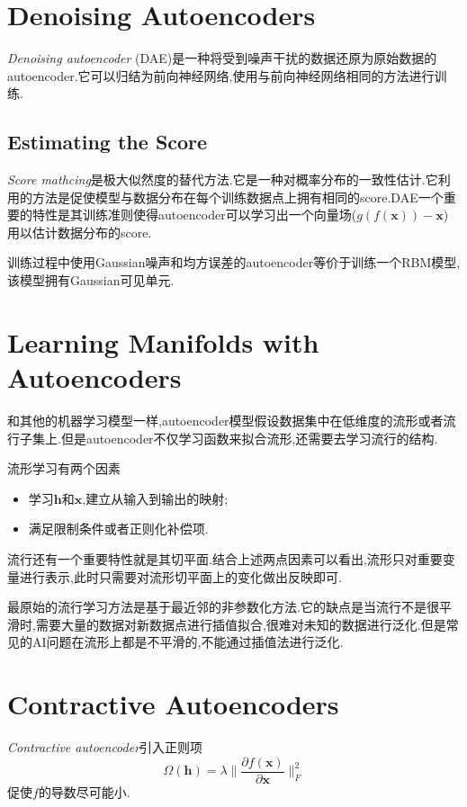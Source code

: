 \section{Denoising Autoencoders}

\textit{Denoising autoencoder} (DAE)是一种将受到噪声干扰的数据还原为原始数据的autoencoder.它可以归结为前向神经网络,使用与前向神经网络相同的方法进行训练.

\subsection{Estimating the Score}

\textit{Score mathcing}是极大似然度的替代方法.它是一种对概率分布的一致性估计.它利用的方法是促使模型与数据分布在每个训练数据点上拥有相同的score.DAE一个重要的特性是其训练准则使得autoencoder可以学习出一个向量场($g(f(\mathbf x))-\mathbf x$)用以估计数据分布的score.

训练过程中使用Gaussian噪声和均方误差的autoencoder等价于训练一个RBM模型,该模型拥有Gaussian可见单元.

\section{Learning Manifolds with Autoencoders}

和其他的机器学习模型一样,autoencoder模型假设数据集中在低维度的流形或者流行子集上.但是autoencoder不仅学习函数来拟合流形,还需要去学习流行的结构.

流形学习有两个因素
\begin{itemize}
    \item 学习$\mathbf h$和$\mathbf x$,建立从输入到输出的映射;
    \item 满足限制条件或者正则化补偿项.
\end{itemize}

流行还有一个重要特性就是其切平面.结合上述两点因素可以看出,流形只对重要变量进行表示,此时只需要对流形切平面上的变化做出反映即可.

最原始的流行学习方法是基于最近邻的非参数化方法.它的缺点是当流行不是很平滑时,需要大量的数据对新数据点进行插值拟合,很难对未知的数据进行泛化.但是常见的AI问题在流形上都是不平滑的,不能通过插值法进行泛化.

\section{Contractive Autoencoders}

\textit{Contractive autoencoder}引入正则项
\begin{equation}
\Omega(\mathbf h)=\lambda\Big\|\frac{\partial f(\mathbf x)}{\partial\mathbf x}\Big\|^2_F
\end{equation}
促使$f$的导数尽可能小.

